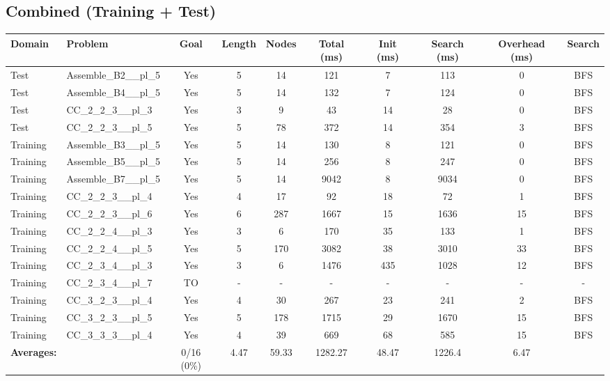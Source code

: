 \documentclass{article}
\begin{document}
\subsection*{Combined (Training + Test)}
\begin{tabular}{llcccccccc}
\toprule
Domain & Problem & Goal & Length & Nodes & Total (ms) & Init (ms) & Search (ms) & Overhead (ms) & Search \\
\midrule
Test & Assemble\_B2\_\_pl\_5 & Yes & 5 & 14 & 121 & 7 & 113 & 0 & BFS \\
Test & Assemble\_B4\_\_pl\_5 & Yes & 5 & 14 & 132 & 7 & 124 & 0 & BFS \\
Test & CC\_2\_2\_3\_\_pl\_3 & Yes & 3 & 9 & 43 & 14 & 28 & 0 & BFS \\
Test & CC\_2\_2\_3\_\_pl\_5 & Yes & 5 & 78 & 372 & 14 & 354 & 3 & BFS \\
Training & Assemble\_B3\_\_pl\_5 & Yes & 5 & 14 & 130 & 8 & 121 & 0 & BFS \\
Training & Assemble\_B5\_\_pl\_5 & Yes & 5 & 14 & 256 & 8 & 247 & 0 & BFS \\
Training & Assemble\_B7\_\_pl\_5 & Yes & 5 & 14 & 9042 & 8 & 9034 & 0 & BFS \\
Training & CC\_2\_2\_3\_\_pl\_4 & Yes & 4 & 17 & 92 & 18 & 72 & 1 & BFS \\
Training & CC\_2\_2\_3\_\_pl\_6 & Yes & 6 & 287 & 1667 & 15 & 1636 & 15 & BFS \\
Training & CC\_2\_2\_4\_\_pl\_3 & Yes & 3 & 6 & 170 & 35 & 133 & 1 & BFS \\
Training & CC\_2\_2\_4\_\_pl\_5 & Yes & 5 & 170 & 3082 & 38 & 3010 & 33 & BFS \\
Training & CC\_2\_3\_4\_\_pl\_3 & Yes & 3 & 6 & 1476 & 435 & 1028 & 12 & BFS \\
Training & CC\_2\_3\_4\_\_pl\_7 & TO & - & - & - & - & - & - & - \\
Training & CC\_3\_2\_3\_\_pl\_4 & Yes & 4 & 30 & 267 & 23 & 241 & 2 & BFS \\
Training & CC\_3\_2\_3\_\_pl\_5 & Yes & 5 & 178 & 1715 & 29 & 1670 & 15 & BFS \\
Training & CC\_3\_3\_3\_\_pl\_4 & Yes & 4 & 39 & 669 & 68 & 585 & 15 & BFS \\
\textbf{Averages:} & & 0/16 (0\%) & 4.47 & 59.33 & 1282.27 & 48.47 & 1226.4 & 6.47 & \\
\bottomrule
\end{tabular}
\newpage
\end{document}
